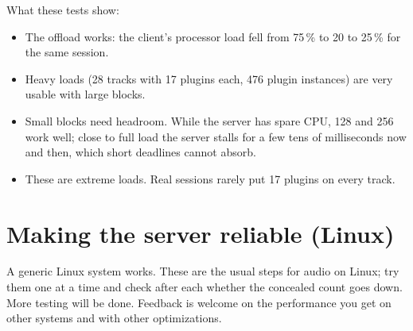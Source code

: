 What these tests show:

\begin{itemize}
  \item The offload works: the client's processor load fell from 75\,\% to
    20 to 25\,\% for the same session.
  \item Heavy loads (28 tracks with 17 plugins each, 476 plugin instances)
    are very usable with large blocks.
  \item Small blocks need headroom. While the server has spare CPU, 128 and
    256 work well; close to full load the server stalls for a few tens of
    milliseconds now and then, which short deadlines cannot absorb.
  \item These are extreme loads. Real sessions rarely put 17 plugins on every
    track.
\end{itemize}

\section{Making the server reliable (Linux)}
\label{sec:linuxtuning}

A generic Linux system works. These are the usual steps for audio on Linux;
try them one at a time and check after each whether the concealed count goes
down. More testing will be done. Feedback is welcome on the performance you get on other systems and with other optimizations.

